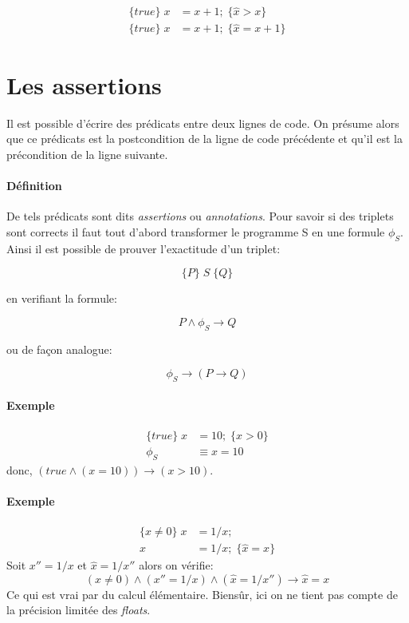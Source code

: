 \documentclass[12pt]{article}
\begin{document}
\begin{align*}  
    \{true\}\; x &= x+1;\; \{\hat{x}>x\}\\
    \{true\}\; x &= x+1;\; \{\hat{x} = x + 1\}
\end{align*}

\section*{Les assertions}
Il est possible d'écrire des prédicats entre deux lignes de code. On
présume alors que ce prédicats est la postcondition de la ligne de code
précédente et qu'il est la précondition de la ligne suivante.

\paragraph*{Définition}

De tels prédicats sont dits \emph{assertions} ou \emph{annotations}.
Pour savoir si des triplets sont corrects il faut tout d'abord transformer
le programme S en une formule \(\phi_{S}\). Ainsi il est possible de prouver
l'exactitude d'un triplet:

\begin{equation*}
    \{P\}\; S\; \{Q\}
\end{equation*}

en verifiant la formule: 

\begin{equation*}
    P \wedge \phi_{S} \rightarrow Q
\end{equation*}

ou de façon analogue:

\begin{equation*}
    \phi_{S} \rightarrow (P \rightarrow Q)
\end{equation*}

\paragraph*{Exemple}
\begin{align*}
    \{true\}\; x &= 10; \; \{x > 0\}\\
    \phi_{S} &\equiv x = 10
\end{align*}
donc, $(true \wedge ( x = 10))\rightarrow (x>10)$.
\paragraph*{Exemple}
\begin{align*}
    \{x \neq 0\}\; x &= 1/x;\\
    x &= 1/x; \; \{\hat{x} = x\}
\end{align*}
Soit $x'' = 1/x$ et $\hat{x} = 1/x''$ alors on vérifie:
\begin{equation*}
    (x \neq 0) \wedge (x'' = 1/x) \wedge (\hat{x} = 1/x'') \rightarrow \hat{x} = x
\end{equation*}
Ce qui est vrai par du calcul élémentaire. Biensûr, ici on ne tient pas
compte de la précision limitée des \emph{floats}.
\end{document}
